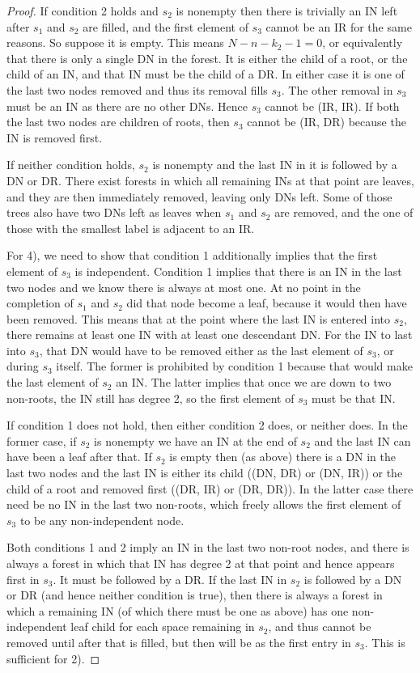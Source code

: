 \documentclass{article}
\begin{document}
\begin{proof}
    If condition 2 holds and $s_2$ is nonempty then there is trivially an IN left after $s_1$ and $s_2$ are filled, and the first element of $s_3$ cannot be an IR for the same reasons. So suppose it is empty. This means $N-n-k_2-1=0$, or equivalently that there is only a single DN in the forest. It is either the child of a root, or the child of an IN, and that IN must be the child of a DR. In either case it is one of the last two nodes removed and thus its removal fills $s_3$. The other removal in $s_3$ must be an IN as there are no other DNs. Hence $s_3$ cannot be (IR, IR). If both the last two nodes are children of roots, then $s_3$ cannot be (IR, DR) because the IN is removed first. 
    
    If neither condition holds, $s_2$ is nonempty and the last IN in it is followed by a DN or DR. There exist forests in which all remaining INs at that point are leaves, and they are then immediately removed, leaving only DNs left. Some of those trees also have two DNs left as leaves when $s_1$ and $s_2$ are removed, and the one of those with the smallest label is adjacent to an IR.

    For 4), we need to show that condition 1 additionally implies that the first element of $s_3$ is independent. Condition 1 implies that there is an IN in the last two nodes and we know there is always at most one. At no point in the completion of $s_1$ and $s_2$ did that node become a leaf, because it would then have been removed. This means that at the point where the last IN is entered into $s_2$, there remains at least one IN with at least one descendant DN. For the IN to last into $s_3$, that DN would have to be removed either as the last element of $s_3$, or during $s_3$ itself. The former is prohibited by condition 1 because that would make the last element of $s_2$ an IN. The latter implies that once we are down to two non-roots, the IN still has degree 2, so the first element of $s_3$ must be that IN.

    If condition 1 does not hold, then either condition 2 does, or neither does. In the former case, if $s_2$ is nonempty we have an IN at the end of $s_2$ and the last IN can have been a leaf after that. If $s_2$ is empty then (as above) there is a DN in the last two nodes and the last IN is either its child ((DN, DR) or (DN, IR)) or the child of a root and removed first ((DR, IR) or (DR, DR)). In the latter case there need be no IN in the last two non-roots, which freely allows the first element of $s_3$ to be any non-independent node.

    Both conditions 1 and 2 imply an IN in the last two non-root nodes, and there is always a forest in which that IN has degree 2 at that point and hence appears first in $s_3$. It must be followed by a DR. If the last IN in $s_2$ is followed by a DN or DR (and hence neither condition is true), then there is always a forest in which a remaining IN (of which there must be one as above) has one non-independent leaf child for each space remaining in $s_2$, and thus cannot be removed until after that is filled, but then will be as the first entry in $s_3$. This is sufficient for 2).
    \end{proof}
\end{document}
